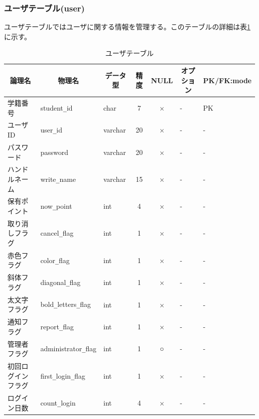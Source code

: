 \documentclass[a4j]{jarticle}
\begin{document}
\subsubsection{ユーザテーブル(user)}
ユーザテーブルではユーザに関する情報を管理する。このテーブルの詳細は表\ref{tab:user} に示す。
\begin{table}[h]

  \caption{ユーザテーブル}
  \begin{center}
    \footnotesize
    \begin{tabular}{|l|l|l|c|c|l|l|} \hline

      \multicolumn{1}{|c|}{論理名}&\multicolumn{1}{|c|}{物理名}&\multicolumn{1}{|c|}{データ型}&精度&NULL&\multicolumn{1}{|c|}{オプション}&\multicolumn{1}{|c|}{PK/FK:mode}\\\hline \hline
      学籍番号&student\verb|_|id&char&7&×&-&\multicolumn{1}{|l|}{PK} \\\hline
      ユーザID&user\verb|_|id&varchar&20&×&-&- \\ \hline
      パスワード&password&varchar&20&×&-&- \\ \hline
      ハンドルネーム&write\verb|_|name&varchar&15&×&-&- \\ \hline
      保有ポイント&now\verb|_|point&int&4&×&-&- \\ \hline
      取り消しフラグ&cancel\verb|_|flag&int&1&×&-&- \\ \hline
      赤色フラグ&color\verb|_|flag&int&1&×&-&- \\ \hline
      斜体フラグ&diagonal\verb|_|flag&int&1&×&-&- \\ \hline
      太文字フラグ&bold\verb|_|letters\verb|_|flag&int&1&×&-&- \\ \hline
      通知フラグ&report\verb|_|flag&int&1&×&-&- \\ \hline
      管理者フラグ&administrator\verb|_|flag&int&1&○&-&- \\ \hline
      初回ログインフラグ&first\verb|_|login\verb|_|flag&int&1&×&-&- \\ \hline
      ログイン日数&count\verb|_|login&int&4&×&-&-\\ \hline
    \end{tabular}
    \label{tab:user}
  \end{center}
\end{table}
\end{document}
